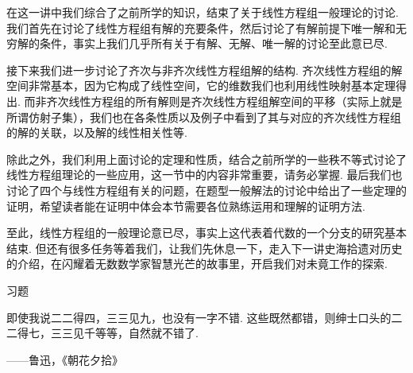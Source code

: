 在这一讲中我们综合了之前所学的知识，结束了关于线性方程组一般理论的讨论. 我们首先在讨论了线性方程组有解的充要条件，然后讨论了有解前提下唯一解和无穷解的条件，事实上我们几乎所有关于有解、无解、唯一解的讨论至此意已尽.

接下来我们进一步讨论了齐次与非齐次线性方程组解的结构. 齐次线性方程组的解空间非常基本，因为它构成了线性空间，它的维数我们也利用线性映射基本定理得出. 而非齐次线性方程组的所有解则是齐次线性方程组解空间的平移（实际上就是所谓仿射子集），我们也在各条性质以及例子中看到了其与对应的齐次线性方程组的解的关联，以及解的线性相关性等.

除此之外，我们利用上面讨论的定理和性质，结合之前所学的一些秩不等式讨论了线性方程组理论的一些应用，这一节中的内容非常重要，请务必掌握. 最后我们也讨论了四个与线性方程组有关的问题，在题型一般解法的讨论中给出了一些定理的证明，希望读者能在证明中体会本节需要各位熟练运用和理解的证明方法.

至此，线性方程组的一般理论意已尽，事实上这代表着代数的一个分支的研究基本结束. 但还有很多任务等着我们，让我们先休息一下，走入下一讲史海拾遗对历史的介绍，在闪耀着无数数学家智慧光芒的故事里，开启我们对未竟工作的探索.

\vspace{2ex}
\centerline{\heiti \Large 习题}

\vspace{2ex}
{\kaishu 即使我说二二得四，三三见九，也没有一字不错. 这些既然都错，则绅士口头的二二得七，三三见千等等，自然就不错了.}
\begin{flushright}
    \kaishu
    ——鲁迅，《朝花夕拾》
\end{flushright}

